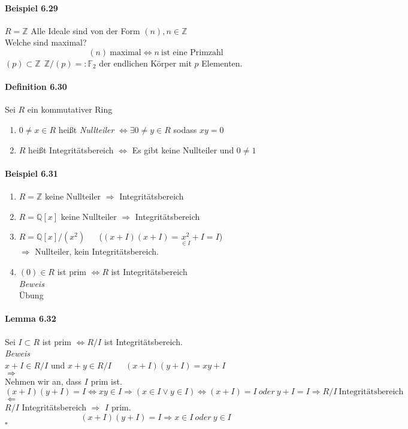 \documentclass{scrartcl}
\begin{document}
\paragraph{Beispiel 6.29}
$R = \mathbb{Z}$ Alle Ideale sind von der Form $(n), n \in \mathbb{Z}$ \\
Welche sind maximal?
\[
  (n) ~\text{maximal} \Leftrightarrow n ~\text{ist eine Primzahl}
\]
$(p) \subset \mathbb{Z} ~~ \mathbb{Z}/(p) =: \mathbb{F}_{2}$ der endlichen Körper
mit $p$ Elementen.

\paragraph{Definition 6.30}
Sei $R$ ein kommutativer Ring
\begin{enumerate}
\item $0 \neq x \in R$ heißt \textit{Nullteiler}
  $\Leftrightarrow \exists 0 \neq y \in R$ sodass $xy = 0$
\item $R$ heißt Integritätsbereich $\Leftrightarrow$
  Es gibt keine Nullteiler und $0 \neq 1$
\end{enumerate}

\paragraph{Beispiel 6.31}
\begin{enumerate}
\item $R = \mathbb{Z}$ keine Nullteiler  $\Rightarrow$ Integritätsbereich
\item $R = \mathbb{Q}[x]$ keine Nullteiler $\Rightarrow$ Integritätsbereich
\item $R = \mathbb{Q}[x]/\left(x^2\right)$ ~~
  ($(x + I)(x + I) = \underset{\in I}{x^2} + I = I$) \\
  $\Rightarrow$ Nullteiler, kein Integritätsbereich.
\item $(0) \in R$ ist prim $\Leftrightarrow R$ ist Integritätsbereich \\
  \textit{Beweis} \\
  Übung
\end{enumerate}

\paragraph{Lemma 6.32}
Sei $I \subset R$ ist prim $\Leftrightarrow R/I$ ist Integritätsbereich. \\
\textit{Beweis} \\
$x + I \in R/I$ und $x + y \in R/I$ ~~ $(x+I)(y+I) = xy + I$ \\
\grqq $\Rightarrow$ \grqq \\
Nehmen wir an, dass $I$ prim ist.
\[
  (x + I)(y + I) = I \Leftrightarrow xy \in I \Rightarrow (x \in I \vee y \in I)
  \Leftrightarrow (x + I) = I ~oder~ y + I = I
  \Rightarrow R/I ~\text{Integritätsbereich}
\]
\grqq $\Leftarrow$ \grqq \\
$R/I$ Integritätsbereich $\Rightarrow$ $I$ prim.
\[
  (x + I)(y + I) = I \Rightarrow x \in I ~oder~ y \in I
\]
\hfill $\square$
\end{document}
